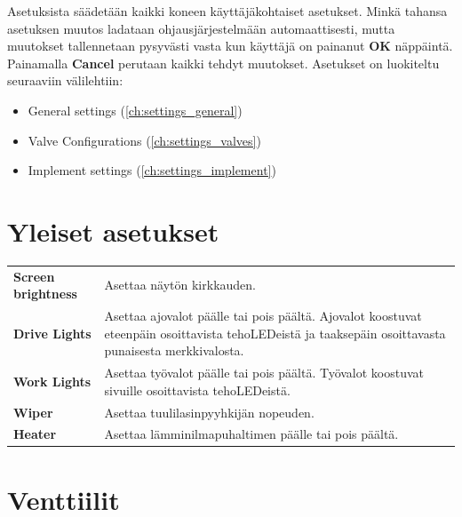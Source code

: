 \documentclass[12pt,a4paper,finnish]{uvmanual}
\begin{document}
Asetuksista säädetään kaikki koneen käyttäjäkohtaiset asetukset. Minkä tahansa asetuksen muutos ladataan ohjausjärjestelmään automaattisesti, mutta muutokset tallennetaan pysyvästi vasta kun käyttäjä on painanut \textbf{OK} näppäintä. Painamalla \textbf{Cancel} perutaan kaikki tehdyt muutokset. Asetukset on luokiteltu seuraaviin välilehtiin:

\begin{itemize}
 \item General settings (\autoref{ch:settings_general})
 \item Valve Configurations (\autoref{ch:settings_valves})
 \item Implement settings (\autoref{ch:settings_implement})
\end{itemize}



\section{Yleiset asetukset}\label{ch:settings_general}



\begin{tabular}{ L{0.2\textwidth} L{0.66\textwidth} }
\textbf{Screen brightness} & Asettaa näytön kirkkauden.\\
\textbf{Drive Lights} & Asettaa ajovalot päälle tai pois päältä. Ajovalot koostuvat eteenpäin osoittavista tehoLEDeistä ja taaksepäin osoittavasta punaisesta merkkivalosta. \\
\textbf{Work Lights} & Asettaa työvalot päälle tai pois päältä. Työvalot koostuvat sivuille osoittavista tehoLEDeistä. \\
\textbf{Wiper} & Asettaa tuulilasinpyyhkijän nopeuden. \\
\textbf{Heater} & Asettaa lämminilmapuhaltimen päälle tai pois päältä. \\
\end{tabular}




\section{Venttiilit}\label{ch:settings_valves}
\end{document}
